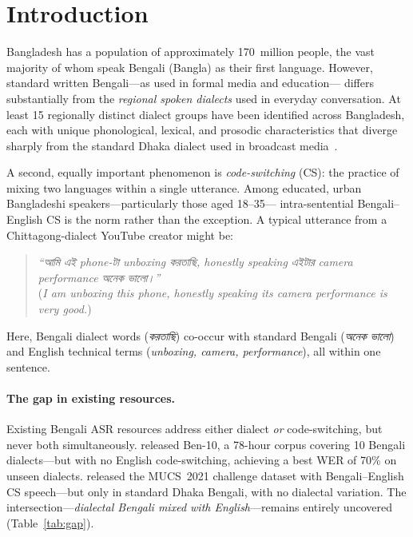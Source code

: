 \section{Introduction}
\label{sec:intro}

Bangladesh has a population of approximately 170~million people, the vast
majority of whom speak Bengali (Bangla) as their first language.
However, standard written Bengali---as used in formal media and education---
differs substantially from the \emph{regional spoken dialects} used in everyday
conversation.
At least 15 regionally distinct dialect groups have been identified across
Bangladesh, each with unique phonological, lexical, and prosodic characteristics
that diverge sharply from the standard Dhaka dialect used in broadcast
media~\citep{chowdhury2014bengali}.

A second, equally important phenomenon is \emph{code-switching} (CS): the
practice of mixing two languages within a single utterance.
Among educated, urban Bangladeshi speakers---particularly those aged 18--35---
intra-sentential Bengali--English CS is the norm rather than the exception.
A typical utterance from a Chittagong-dialect YouTube creator might be:
\begin{quote}
\small\textit{``আমি এই phone-টা unboxing করতাছি, honestly speaking এইটার
camera performance অনেক ভালো।''}\\
\normalsize (\emph{I am unboxing this phone, honestly speaking its camera
performance is very good.})
\end{quote}
Here, Bengali dialect words (\textit{করতাছি}) co-occur with standard Bengali
(\textit{অনেক ভালো}) and English technical terms (\textit{unboxing, camera,
performance}), all within one sentence.

\paragraph{The gap in existing resources.}
Existing Bengali ASR resources address either dialect \emph{or} code-switching,
but never both simultaneously.
\citet{ben10_2025} released Ben-10, a 78-hour corpus covering 10 Bengali
dialects---but with no English code-switching, achieving a best WER of 70\%
on unseen dialects.
\citet{mucs2021} released the MUCS~2021 challenge dataset with Bengali--English
CS speech---but only in standard Dhaka Bengali, with no dialectal variation.
The intersection---\emph{dialectal Bengali mixed with English}---remains
entirely uncovered (Table~\ref{tab:gap}).

